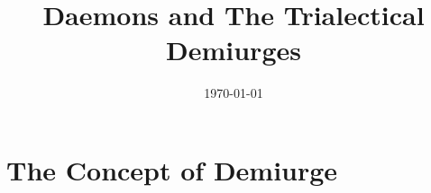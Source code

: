 \documentclass[12pt,a4paper]{article}
\title{
    Daemons and The Trialectical Demiurges \\
}
\date{\today}
\begin{document}
\makeatletter
\newcommand{\myabstract}{
    This text is an intellectual exercise which lies between fantasy and analytical digression about spiritual phenomena affecting this world. Although aiming to be an actual theory, it cannot be truly analytical, because of the nature of metaphysics and the inevitable necessity for priori assumptions about the unknown, so it should be treated as something between fantasy and reality to any reader.
}
\renewcommand{\maketitle}{
    \newpage
    \null
    \vskip 2em
    \begin{center}
        {\LARGE \bfseries \@title \par}
        \vskip 1.5em
        {\large 
        \lineskip .5em
            \begin{tabular}[t]{c}
                \ifx\@empty\@author\else\textbf{\@author}\fi\\
                \ifx\@empty\@date\else\small\textit{\@date}\fi
            \end{tabular}\par}
        \vskip 1em
        \hrule
        \vskip 1.5em
        \begin{minipage}{0.95\textwidth}
            \centering
            \itshape
            \hspace{\baselineskip}
            \myabstract
        \end{minipage}
        \vskip 2em
    \end{center}
}
\makeatother
\renewcommand{\today}{\the\year-\the\month}
\begin{titlepage}
    \maketitle 
    \thispagestyle{empty} 
\end{titlepage}

\tableofcontents 

\section{The Concept of Demiurge}

\hspace{\baselineskip}
\end{document}
